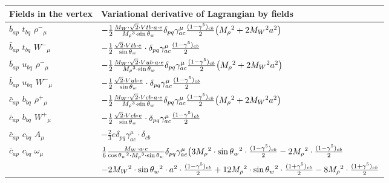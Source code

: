 \begin{center}
\begin{tabular}{|l|l|} \hline
Fields in the vertex & Variational derivative of Lagrangian by fields \\ \hline
$\bar{b}{}_{a p }$ \phantom{-} $t{}_{b q }$ \phantom{-} $\rho^-{}_{\mu }$ \phantom{-}  &
	$-\frac{1}{2}\frac{ M_W \cdot\sqrt{2} \cdot Vtb \cdot a \cdot e}{ M_\rho{}^3  \cdot \sin{\theta}_w}\delta_{p q} \gamma_{a c}^\mu {(1-\gamma^5)_{c b}\over 2} \big( M_\rho{}^2 +2 M_W{}^2  a{}^2 \big)$\\[2mm]
$\bar{b}{}_{a p }$ \phantom{-} $t{}_{b q }$ \phantom{-} $W^-{}_{\mu }$ \phantom{-}  &
	$-\frac{1}{2}\frac{\sqrt{2} \cdot Vtb \cdot e}{ \sin{\theta}_w}\cdot \delta_{p q} \gamma_{a c}^\mu {(1-\gamma^5)_{c b}\over 2} $\\[2mm]
$\bar{b}{}_{a p }$ \phantom{-} $u{}_{b q }$ \phantom{-} $\rho^-{}_{\mu }$ \phantom{-}  &
	$-\frac{1}{2}\frac{ M_W \cdot\sqrt{2} \cdot Vub \cdot a \cdot e}{ M_\rho{}^3  \cdot \sin{\theta}_w}\delta_{p q} \gamma_{a c}^\mu {(1-\gamma^5)_{c b}\over 2} \big( M_\rho{}^2 +2 M_W{}^2  a{}^2 \big)$\\[2mm]
$\bar{b}{}_{a p }$ \phantom{-} $u{}_{b q }$ \phantom{-} $W^-{}_{\mu }$ \phantom{-}  &
	$-\frac{1}{2}\frac{\sqrt{2} \cdot Vub \cdot e}{ \sin{\theta}_w}\cdot \delta_{p q} \gamma_{a c}^\mu {(1-\gamma^5)_{c b}\over 2} $\\[2mm]
$\bar{c}{}_{a p }$ \phantom{-} $b{}_{b q }$ \phantom{-} $\rho^+{}_{\mu }$ \phantom{-}  &
	$-\frac{1}{2}\frac{ M_W \cdot\sqrt{2} \cdot Vcb \cdot a \cdot e}{ M_\rho{}^3  \cdot \sin{\theta}_w}\delta_{p q} \gamma_{a c}^\mu {(1-\gamma^5)_{c b}\over 2} \big( M_\rho{}^2 +2 M_W{}^2  a{}^2 \big)$\\[2mm]
$\bar{c}{}_{a p }$ \phantom{-} $b{}_{b q }$ \phantom{-} $W^+{}_{\mu }$ \phantom{-}  &
	$-\frac{1}{2}\frac{\sqrt{2} \cdot Vcb \cdot e}{ \sin{\theta}_w}\cdot \delta_{p q} \gamma_{a c}^\mu {(1-\gamma^5)_{c b}\over 2} $\\[2mm]
$\bar{c}{}_{a p }$ \phantom{-} $c{}_{b q }$ \phantom{-} ${A}_{\mu }$ \phantom{-}  &
	$-\frac{2}{3} e\delta_{p q} \gamma_{a c}^\mu \cdot \delta_{c b} $\\[2mm]
$\bar{c}{}_{a p }$ \phantom{-} $c{}_{b q }$ \phantom{-} $\omega{}_{\mu }$ \phantom{-}  &
	$\frac{1}{6}\frac{ M_W \cdot a \cdot e}{ \cos{\theta}_w{}^2  \cdot M_\rho{}^3  \cdot \sin{\theta}_w}\delta_{p q} \gamma_{a c}^\mu \big(3 M_\rho{}^2 \cdot  \sin{\theta}_w{}^2 \cdot {(1-\gamma^5)_{c b}\over 2} -2 M_\rho{}^2 \cdot {(1-\gamma^5)_{c b}\over 2} $ \\[2mm]
  & $-2 M_W{}^2 \cdot  \sin{\theta}_w{}^2 \cdot  a{}^2 \cdot {(1-\gamma^5)_{c b}\over 2} +12 M_\rho{}^2 \cdot  \sin{\theta}_w{}^2 \cdot {(1+\gamma^5)_{c b}\over 2} -8 M_\rho{}^2 \cdot {(1+\gamma^5)_{c b}\over 2} $ \\[2mm]

\end{tabular}
\end{center}
